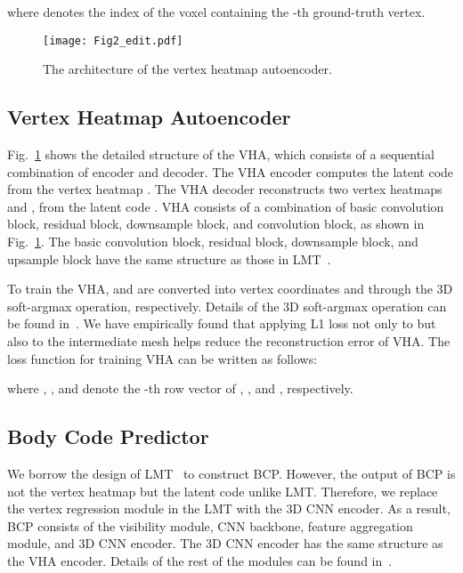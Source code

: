 \documentclass{article}
\begin{document}
where  denotes the index of the voxel containing the -th ground-truth vertex.

\begin{figure}[t]
\centering
\texttt{[image: Fig2\_edit.pdf]}
\caption{The architecture of the vertex heatmap autoencoder.}
\label{fig:vha}
\end{figure}


\subsection{Vertex Heatmap Autoencoder}
\label{ssec:vha}

Fig.~\ref{fig:vha} shows the detailed structure of the VHA, which consists of a sequential combination of encoder and decoder. The VHA encoder computes the latent code  from the vertex heatmap . The VHA decoder reconstructs two vertex heatmaps  and , from the latent code . VHA consists of a combination of basic convolution block, residual block, downsample block, and  convolution block, as shown in Fig.~\ref{fig:vha}. The basic convolution block, residual block, downsample block, and upsample block have the same structure as those in LMT~\cite{Chun_2023_WACV}.


To train the VHA,  and  are converted into vertex coordinates  and  through the 3D soft-argmax operation, respectively. Details of the 3D soft-argmax operation can be found in~\cite{2018_Sun, 2019_LT, Chun_2023_WACV}. We have empirically found that applying L1 loss not only to  but also to the intermediate mesh  helps reduce the reconstruction error of VHA. The loss function for training VHA can be written as follows:



where , , and  denote the -th row vector of , , and , respectively.




\subsection{Body Code Predictor}
\label{ssec:bcp}

We borrow the design of LMT~\cite{Chun_2023_WACV} to construct BCP. However, the output of BCP is not the vertex heatmap but the latent code unlike LMT. Therefore, we replace the vertex regression module in the LMT with the 3D CNN encoder. As a result, BCP consists of the visibility module, CNN backbone, feature aggregation module, and 3D CNN encoder. The 3D CNN encoder has the same structure as the VHA encoder. Details of the rest of the modules can be found in~\cite{Chun_2023_WACV}. 
\end{document}
